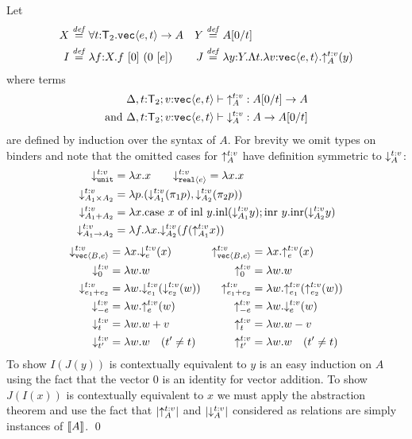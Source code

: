 \begin{example}
Let 
\begin{align*}
X & \stackrel{\mathit{def}}= \forall t\mathord:\mathsf{T}_2.\textup{\texttt{vec}}\langle e,t \rangle\to A
& 
Y & \stackrel{\mathit{def}}= A[0/t]\\
I & \stackrel{\mathit{def}}= \lambda f\mathord: X. f\ [0]\ (0\ [e])
& 
J & \stackrel{\mathit{def}}= \lambda y\mathord: Y. \Lambda t.\lambda v\mathord:\textup{\texttt{vec}}\langle e,t \rangle. \mathord\uparrow_{A}^{t\mathord:v} (y)
\end{align*}
where terms 
\begin{align*}
&
\Delta,t\mathord:\mathsf{T}_2;v\mathord:\textup{\texttt{vec}}\langle e,t \rangle\vdash \mathord\uparrow_{A}^{t\mathord:v} : A[0/t] \to A
\\\text{and } &
\Delta,t\mathord:\mathsf{T}_2;v\mathord:\textup{\texttt{vec}}\langle e,t \rangle\vdash \mathord\downarrow_{A}^{t\mathord:v} : A\to A[0/t]
\end{align*}
are defined by induction over the syntax of $A$. For brevity we omit types on binders
and note that the omitted cases for $\mathord\uparrow_{A}^{t\mathord:v}$ 
have definition symmetric to $\mathord\downarrow_{A}^{t\mathord:v}$:
\begin{align*}
\mathord\downarrow_{\textup{\texttt{unit}}}^{t\mathord:v} &= \lambda x. x
\qquad 
\mathord\downarrow_{\textup{\texttt{real}}\langle e \rangle}^{t\mathord:v} = \lambda x. x
\\
\mathord\downarrow_{A_1\times A_2}^{t\mathord:v} &= \lambda p. (\mathord\downarrow_{A_1}^{t\mathord:v}(\pi_1 p),\mathord\downarrow_{A_2}^{t\mathord:v}(\pi_2 p))
\\
\mathord\downarrow_{A_1 + A_2}^{t\mathord:v} &= \lambda x.
\textrm{case}\ x\ \textrm{of}\ \textrm{inl}\ y.\textrm{inl}(\mathord\downarrow_{A_1}^{t\mathord:v} y); \textrm{inr}\ y.\textrm{inr}(\mathord\downarrow_{A_2}^{t\mathord:v} y)
\\ 
\mathord\downarrow_{A_1\to A_2}^{t\mathord:v} &= \lambda f. \lambda x. \mathord\downarrow_{A_2}^{t\mathord:v} (f(\mathord\uparrow_{A_1}^{t\mathord:v} x))
\end{align*}
\begin{align*}
\mathord\downarrow_{\textup{\texttt{vec}}\langle B,e \rangle}^{t\mathord:v} &= \lambda x. \mathord\downarrow_{e}^{t\mathord:v} (x) 
&
\mathord\uparrow_{\textup{\texttt{vec}}\langle B,e \rangle}^{t\mathord:v} &= \lambda x. \mathord\uparrow_{e}^{t\mathord:v} (x)
\\
\mathord\downarrow_{0}^{t\mathord:v} &= \lambda w.w
&
\mathord\uparrow_{0}^{t\mathord:v} &= \lambda w.w
\\ 
\mathord\downarrow_{e_1+e_2}^{t\mathord:v} &= \lambda w.\mathord\downarrow_{e_1}^{t\mathord:v}(\mathord\downarrow_{e_2}^{t\mathord:v}(w))
&
\mathord\uparrow_{e_1+e_2}^{t\mathord:v} &= \lambda w.\mathord\uparrow_{e_1}^{t\mathord:v}(\mathord\uparrow_{e_2}^{t\mathord:v}(w))
\\
\mathord\downarrow_{-e}^{t\mathord:v} &= \lambda w.\mathord\uparrow_{e}^{t\mathord:v} (w)
&
\mathord\uparrow_{-e}^{t\mathord:v} &= \lambda w.\mathord\downarrow_{e}^{t\mathord:v} (w)
\\
\mathord\downarrow_{t}^{t\mathord:v} &= \lambda w.w + v 
&
\mathord\uparrow_{t}^{t\mathord:v} &= \lambda w.w - v
\\
\mathord\downarrow_{t'}^{t\mathord:v} &= \lambda w.w\quad(t'\neq t)
&
\mathord\uparrow_{t'}^{t\mathord:v} &= \lambda w.w\quad(t'\neq t)
\end{align*}
To show $I(J(y))$ is contextually equivalent to $y$ is an easy
induction on $A$ using the fact that the vector $0$
is an identity for vector addition. To show $J(I(x))$ is contextually
equivalent to $x$ we must apply the abstraction theorem and use
the fact that $\left| \mathord\uparrow_{A}^{t\mathord:v}\right|$ and $\left| \mathord\downarrow_{A}^{t\mathord:v}\right|$ 
considered as relations are simply instances of $\llbracket A \rrbracket{}{}$.
\qed


\end{example}

